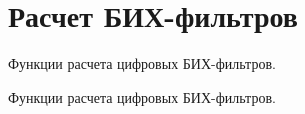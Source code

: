 \hypertarget{group___i_i_r___f_i_l_t_e_r___d_e_s_i_g_n___g_r_o_u_p}{}\section{Расчет БИХ-\/фильтров}
\label{group___i_i_r___f_i_l_t_e_r___d_e_s_i_g_n___g_r_o_u_p}


Функции расчета цифровых БИХ-\/фильтров.  


Функции расчета цифровых БИХ-\/фильтров. 

